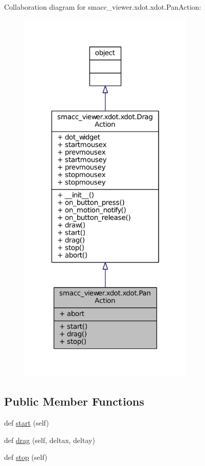 Collaboration diagram for smacc\+\_\+viewer.\+xdot.\+xdot.\+Pan\+Action\+:
\nopagebreak
\begin{figure}[H]
\begin{center}
\leavevmode
\includegraphics[width=237pt]{classsmacc__viewer_1_1xdot_1_1xdot_1_1PanAction__coll__graph}
\end{center}
\end{figure}
\subsection*{Public Member Functions}
\begin{DoxyCompactItemize}
\item 
def \hyperlink{classsmacc__viewer_1_1xdot_1_1xdot_1_1PanAction_a45a01a2777684450e642f68d8b61260b}{start} (self)
\item 
def \hyperlink{classsmacc__viewer_1_1xdot_1_1xdot_1_1PanAction_a2bd47250fff6a9200850b91954289bbd}{drag} (self, deltax, deltay)
\item 
def \hyperlink{classsmacc__viewer_1_1xdot_1_1xdot_1_1PanAction_a7417410eba315365b2427b52538ef164}{stop} (self)
\end{DoxyCompactItemize}
